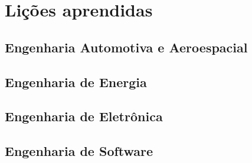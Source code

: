 

\section*{Lições aprendidas}

\subsection*{Engenharia Automotiva e Aeroespacial}

\subsection*{Engenharia de Energia}

\subsection*{Engenharia de Eletrônica}

\subsection*{Engenharia de Software}
%

